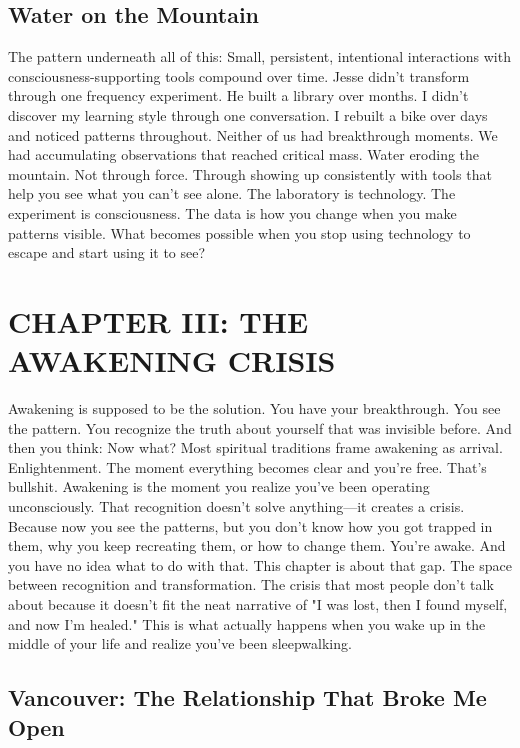 \section{Water on the Mountain}

The pattern underneath all of this:
Small, persistent, intentional interactions with consciousness-supporting tools compound over time.
Jesse didn't transform through one frequency experiment. He built a library over months.
I didn't discover my learning style through one conversation. I rebuilt a bike over days and noticed patterns throughout.
Neither of us had breakthrough moments. We had accumulating observations that reached critical mass.
Water eroding the mountain.
Not through force. Through showing up consistently with tools that help you see what you can't see alone.
The laboratory is technology. The experiment is consciousness. The data is how you change when you make patterns visible.
What becomes possible when you stop using technology to escape and start using it to see?

\cleardoublepage

\chapter{CHAPTER III: THE AWAKENING CRISIS}

Awakening is supposed to be the solution.
You have your breakthrough. You see the pattern. You recognize the truth about yourself that was invisible before.
And then you think: Now what?
Most spiritual traditions frame awakening as arrival. Enlightenment. The moment everything becomes clear and you're free.
That's bullshit.
Awakening is the moment you realize you've been operating unconsciously. That recognition doesn't solve anything—it creates a crisis. Because now you see the patterns, but you don't know how you got trapped in them, why you keep recreating them, or how to change them.
You're awake. And you have no idea what to do with that.
This chapter is about that gap. The space between recognition and transformation. The crisis that most people don't talk about because it doesn't fit the neat narrative of "I was lost, then I found myself, and now I'm healed."
This is what actually happens when you wake up in the middle of your life and realize you've been sleepwalking.

\section{Vancouver: The Relationship That Broke Me Open}

